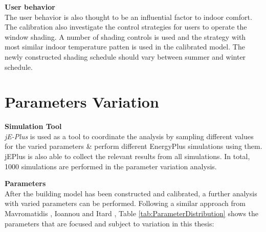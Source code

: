 \documentclass[a4paper, oneside]{discothesis}
\begin{document}
		\textbf{User behavior}\\
			The user behavior is also thought to be an influential factor to indoor comfort. The calibration also investigate the control strategies for users to operate the window shading. A number of shading controls is used and the strategy with most similar indoor temperature patten is used in the calibrated model. The newly constructed shading schedule should vary between summer and winter schedule.\\


	\section{Parameters Variation}
		
		\textbf{Simulation Tool}\\
		\textit{jE-Plus} is used as a tool to coordinate the analysis by sampling different values for the varied parameters \& perform different EnergyPlus simulations using them. jEPlus is also able to collect the relevant results from all simulations. In total, 1000 simulations are performed in the parameter variation analysis.\\
		
		\par
		\textbf{Parameters}\\
		After the building model has been constructed and calibrated, a further analysis with varied parameters can be performed. Following a similar approach from Mavromatidis \cite{GeorgeThesis}, Ioannou and Itard \cite{ioannou2015energy}, Table \ref{tab:ParameterDistribution} shows the parameters that are focused and subject to variation in this thesis:\\
\end{document}
